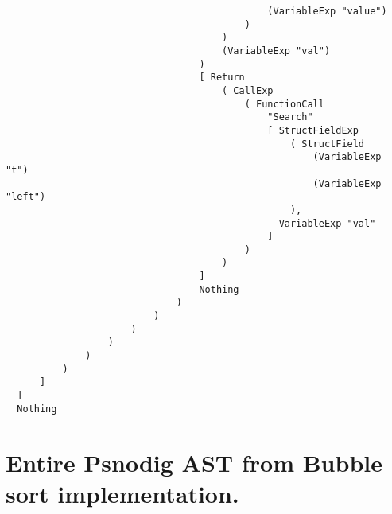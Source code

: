 \begin{lstlisting}
                                              (VariableExp "value")
                                          )
                                      )
                                      (VariableExp "val")
                                  )
                                  [ Return
                                      ( CallExp
                                          ( FunctionCall
                                              "Search"
                                              [ StructFieldExp
                                                  ( StructField
                                                      (VariableExp "t")
                                                      (VariableExp "left")
                                                  ),
                                                VariableExp "val"
                                              ]
                                          )
                                      )
                                  ]
                                  Nothing
                              )
                          )
                      )
                  )
              )
          )
      ]
  ]
  Nothing
\end{lstlisting}


\section{Entire Psnodig AST from Bubble sort implementation.}
\label{appendix:Entire Psnodig AST from Bubble sort implementation.}

